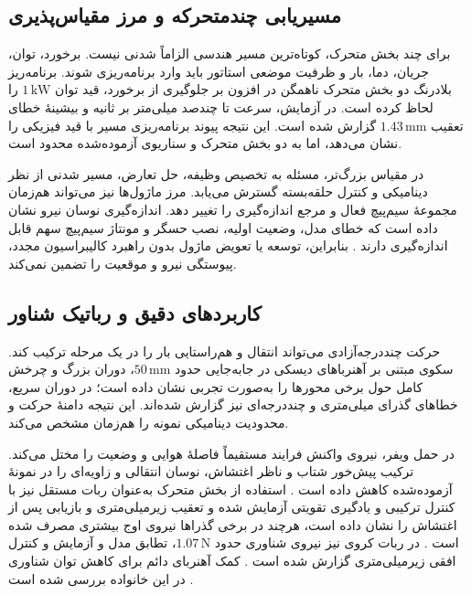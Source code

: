 \subsection{مسیریابی چندمتحرکه و مرز مقیاس‌پذیری}
\label{subsec:multi-mover-routing}

برای چند بخش متحرک، کوتاه‌ترین مسیر هندسی الزاماً شدنی نیست. برخورد، توان، جریان، دما، بار و ظرفیت موضعی استاتور باید وارد برنامه‌ریزی شوند. برنامه‌ریز بلادرنگ دو بخش متحرک ناهمگن در \cite{wangRealtimeRelativeMap2025} افزون بر جلوگیری از برخورد، قید توان \(1\,\mathrm{kW}\) را لحاظ کرده است. در آزمایش، سرعت تا چندصد میلی‌متر بر ثانیه و بیشینهٔ خطای تعقیب \(1.43\,\mathrm{mm}\) گزارش شده است. این نتیجه پیوند برنامه‌ریزی مسیر با قید فیزیکی را نشان می‌دهد، اما به دو بخش متحرک و سناریوی آزموده‌شده محدود است.

در مقیاس بزرگ‌تر، مسئله به تخصیص وظیفه، حل تعارض، مسیر شدنی از نظر دینامیکی و کنترل حلقه‌بسته گسترش می‌یابد. مرز ماژول‌ها نیز می‌تواند هم‌زمان مجموعهٔ سیم‌پیچ فعال و مرجع اندازه‌گیری را تغییر دهد. اندازه‌گیری نوسان نیرو نشان داده است که خطای مدل، وضعیت اولیه، نصب حسگر و مونتاژ سیم‌پیچ سهم قابل اندازه‌گیری دارند \cite{liuFluctuationAnalysisElectromagnetic2024}. بنابراین، توسعه یا تعویض ماژول بدون راهبرد کالیبراسیون مجدد، پیوستگی نیرو و موقعیت را تضمین نمی‌کند.

\subsection{کاربردهای دقیق و رباتیک شناور}
\label{subsec:multidof-precision-applications}
\label{subsec:maglev-robotics-applications}

حرکت چنددرجه‌آزادی می‌تواند انتقال و هم‌راستایی بار را در یک مرحله ترکیب کند. سکوی مبتنی بر آهنرباهای دیسکی در \cite{miyasakaMagneticLevitationUnlimited2014} جابه‌جایی حدود \(50\,\mathrm{mm}\)، دوران بزرگ و چرخش کامل حول برخی محورها را به‌صورت تجربی نشان داده است؛ در دوران سریع، خطاهای گذرای میلی‌متری و چنددرجه‌ای نیز گزارش شده‌اند. این نتیجه دامنهٔ حرکت و محدودیت دینامیکی نمونه را هم‌زمان مشخص می‌کند.

در حمل ویفر، نیروی واکنش فرایند مستقیماً فاصلهٔ هوایی و وضعیت را مختل می‌کند. ترکیب پیش‌خور شتاب و ناظر اغتشاش، نوسان انتقالی و زاویه‌ای را در نمونهٔ آزموده‌شده کاهش داده است \cite{haRobustAirgapStabilization2026}. استفاده از بخش متحرک به‌عنوان ربات مستقل نیز با کنترل ترکیبی  و یادگیری تقویتی آزمایش شده و تعقیب زیرمیلی‌متری و بازیابی پس از اغتشاش را نشان داده است، هرچند در برخی گذراها نیروی اوج بیشتری مصرف شده است \cite{wangRealTimeDeepReinforcement2026d}. در ربات کروی نیز نیروی شناوری حدود \(1.07\,\mathrm{N}\)، تطابق مدل و آزمایش و کنترل افقی زیرمیلی‌متری گزارش شده است \cite{yangFieldAnalysisLevitation2026d}. کمک آهنربای دائم برای کاهش توان شناوری در این خانواده بررسی شده است \cite{zhengLowpowerMagneticLevitation2025}.


